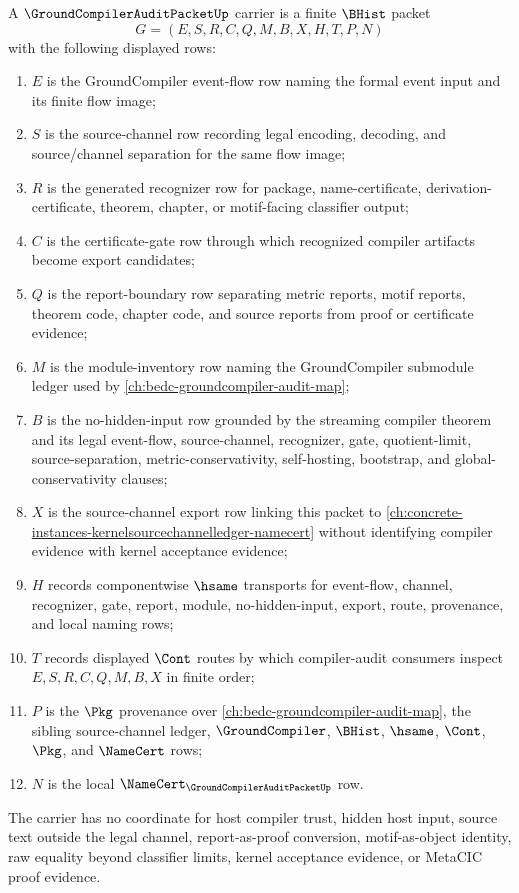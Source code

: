 \begin{definition}
\label{def:groundcompiler-audit-packet-carrier}
A $\GroundCompilerAuditPacketUp$ carrier is a finite $\BHist$ packet
$$
G=(E,S,R,C,Q,M,B,X,H,T,P,N)
$$
with the following displayed rows:
\begin{enumerate}
\item $E$ is the GroundCompiler event-flow row naming the formal event input and its finite flow image;
\item $S$ is the source-channel row recording legal encoding, decoding, and source/channel separation for the same flow image;
\item $R$ is the generated recognizer row for package, name-certificate, derivation-certificate, theorem, chapter, or motif-facing classifier output;
\item $C$ is the certificate-gate row through which recognized compiler artifacts become export candidates;
\item $Q$ is the report-boundary row separating metric reports, motif reports, theorem code, chapter code, and source reports from proof or certificate evidence;
\item $M$ is the module-inventory row naming the GroundCompiler submodule ledger used by \autoref{ch:bedc-groundcompiler-audit-map};
\item $B$ is the no-hidden-input row grounded by the streaming compiler theorem and its legal event-flow, source-channel, recognizer, gate, quotient-limit, source-separation, metric-conservativity, self-hosting, bootstrap, and global-conservativity clauses;
\item $X$ is the source-channel export row linking this packet to \autoref{ch:concrete-instances-kernelsourcechannelledger-namecert} without identifying compiler evidence with kernel acceptance evidence;
\item $H$ records componentwise $\hsame$ transports for event-flow, channel, recognizer, gate, report, module, no-hidden-input, export, route, provenance, and local naming rows;
\item $T$ records displayed $\Cont$ routes by which compiler-audit consumers inspect $E,S,R,C,Q,M,B,X$ in finite order;
\item $P$ is the $\Pkg$ provenance over \autoref{ch:bedc-groundcompiler-audit-map}, the sibling source-channel ledger, $\GroundCompiler$, $\BHist$, $\hsame$, $\Cont$, $\Pkg$, and $\NameCert$ rows;
\item $N$ is the local $\NameCert_{\GroundCompilerAuditPacketUp}$ row.
\end{enumerate}
The carrier has no coordinate for host compiler trust, hidden host input, source text outside the legal channel, report-as-proof conversion, motif-as-object identity, raw equality beyond classifier limits, kernel acceptance evidence, or MetaCIC proof evidence.
\end{definition}

